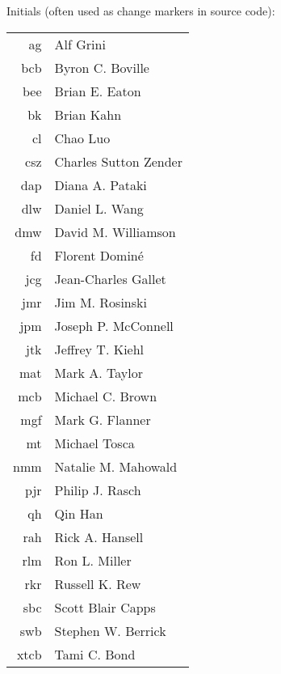\documentclass[12pt,twoside]{article}
\begin{document}
Initials (often used as change markers in source code):
\begin{longtable}[>{\bfseries}l]{>{\ttfamily}r l}
ag  & Alf Grini \\
bcb & Byron C. Boville \\
bee & Brian E. Eaton \\
bk  & Brian Kahn \\
cl  & Chao Luo \\
csz & Charles Sutton Zender \\
dap & Diana A. Pataki \\
dlw & Daniel L. Wang \\
dmw & David M. Williamson \\
fd  & Florent Domin\'{e} \\
jcg & Jean-Charles Gallet \\
jmr & Jim M. Rosinski \\
jpm & Joseph P. McConnell \\
jtk & Jeffrey T. Kiehl \\
mat & Mark A. Taylor \\
mcb & Michael C. Brown \\
mgf & Mark G. Flanner \\
mt  & Michael Tosca \\
nmm & Natalie M. Mahowald \\
pjr & Philip J. Rasch \\
qh  & Qin Han \\
rah & Rick A. Hansell \\
rlm & Ron L. Miller \\
rkr & Russell K. Rew \\
sbc & Scott Blair Capps \\
swb & Stephen W. Berrick \\
xtcb & Tami C. Bond \\
\end{longtable}
\end{document}
